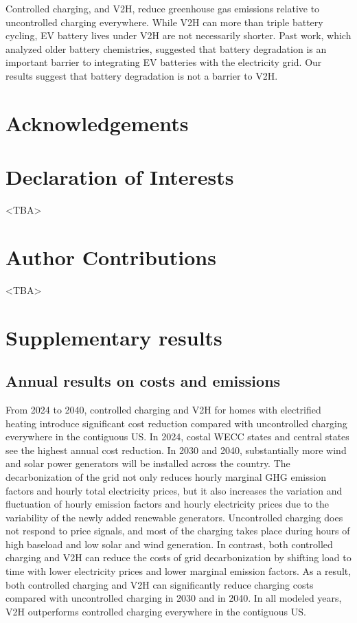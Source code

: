 \documentclass[11pt,preprint]{elsarticle}
\begin{document}
Controlled charging, and V2H, reduce greenhouse gas emissions relative to uncontrolled charging everywhere. While V2H can more than triple battery cycling, EV battery lives under V2H are not necessarily shorter. Past work, which analyzed older battery chemistries, suggested that battery degradation is an important barrier to integrating EV batteries with the electricity grid. Our results suggest that battery degradation is not a barrier to V2H. 

\section*{Acknowledgements}



\section*{Declaration of Interests}
<TBA>

\section*{Author Contributions}
<TBA> 
\makeatletter
\renewcommand \thesection{S\@arabic\c@section}
\renewcommand\thetable{S\@arabic\c@table}
\renewcommand \thefigure{S\@arabic\c@figure}
\makeatother

\renewcommand{\citenumfont}[1]{S#1}

\setcounter{equation}{0}
\setcounter{figure}{0}
\setcounter{table}{0}
\setcounter{section}{0}

\section{Supplementary results}

\subsection{Annual results on costs and emissions}
From 2024 to 2040, controlled charging and V2H for homes with electrified heating introduce significant cost reduction compared with uncontrolled charging everywhere in the contiguous US. In 2024, costal WECC states and central states see the highest annual cost reduction. In 2030 and 2040, substantially more wind and solar power generators will be installed across the country. The decarbonization of the grid not only reduces hourly marginal GHG emission factors and hourly total electricity prices, but it also increases the variation and fluctuation of hourly emission factors and hourly electricity prices due to the variability of the newly added renewable generators. Uncontrolled charging does not respond to price signals, and most of the charging takes place during hours of high baseload and low solar and wind generation. In contrast, both controlled charging and V2H can reduce the costs of grid decarbonization by shifting load to time with lower electricity prices and lower marginal emission factors. As a result, both controlled charging and V2H can significantly reduce charging costs compared with uncontrolled charging in 2030 and in 2040. In all modeled years, V2H outperforms controlled charging everywhere in the contiguous US. 
\end{document}
